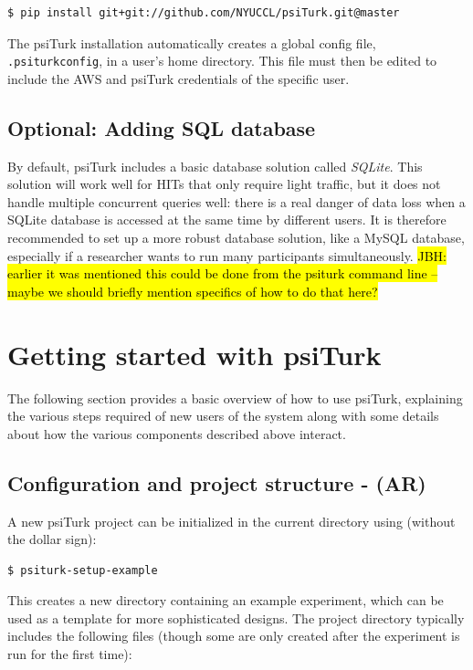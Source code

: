 \documentclass[twocolumn]{svjour3}          %
\newcommand{\psiturk}[0]{\textsf{psiTurk}}
\begin{document}
\begin{lstlisting}
$ pip install git+git://github.com/NYUCCL/psiTurk.git@master
\end{lstlisting}

The \psiturk{} installation automatically creates a global config file, \texttt{.psiturkconfig}, in a user's home directory. 
This file must then be edited to include the AWS and \psiturk{} credentials of the specific user. 

\subsection{Optional: Adding SQL database}
By default, \psiturk{} includes a basic database solution called \emph{SQLite}. This solution
will work well for HITs that only require light traffic, but it does not handle
multiple concurrent queries well: there is a real danger of data loss when a SQLite database is accessed at the same time by different users. 
It is therefore recommended to set up a more robust database solution, like a
MySQL database, especially if a researcher wants to run many participants simultaneously.
\hl{JBH: earlier it was mentioned this could be done from the psiturk command line --
maybe we should briefly mention specifics of how to do that here?}

\section{Getting started with \psiturk{}}

The following section provides a basic overview of how to use \psiturk{},
explaining the various steps required of new users of the system along with
some details about how the various components described above interact.

\subsection{Configuration and project structure - (AR)}

A new \psiturk{} project can be initialized in the current directory using (without the dollar sign):

\begin{lstlisting}
$ psiturk-setup-example
\end{lstlisting}

\noindent This creates a new directory containing an example experiment,
which can be used as a template for more sophisticated designs.
The project directory typically includes the following files (though some are only
created after the experiment is run for the first time):
\end{document}
